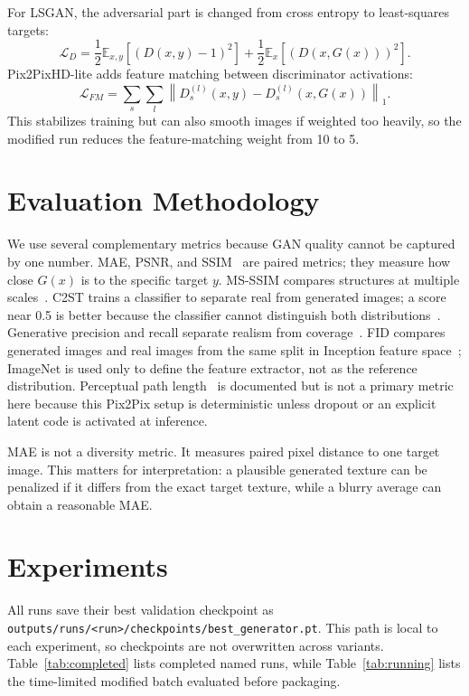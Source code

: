 \documentclass[conference]{IEEEtran}
\newcommand{\code}[1]{\texttt{#1}}
\begin{document}
For LSGAN, the adversarial part is changed from cross entropy to least-squares targets:
\begin{equation}
\mathcal{L}_{D}=\frac{1}{2}\mathbb{E}_{x,y}[(D(x,y)-1)^2]+\frac{1}{2}\mathbb{E}_{x}[(D(x,G(x)))^2].
\end{equation}
Pix2PixHD-lite adds feature matching between discriminator activations:
\begin{equation}
\mathcal{L}_{FM}=\sum_s\sum_l \left\|D_s^{(l)}(x,y)-D_s^{(l)}(x,G(x))\right\|_1.
\end{equation}
This stabilizes training but can also smooth images if weighted too heavily, so the modified run reduces the feature-matching weight from 10 to 5.

\section{Evaluation Methodology}
We use several complementary metrics because GAN quality cannot be captured by one number. MAE, PSNR, and SSIM~\cite{wang2004ssim} are paired metrics; they measure how close $G(x)$ is to the specific target $y$. MS-SSIM compares structures at multiple scales~\cite{wang2003msssim}. C2ST trains a classifier to separate real from generated images; a score near 0.5 is better because the classifier cannot distinguish both distributions~\cite{lopezpaz2017c2st}. Generative precision and recall separate realism from coverage~\cite{sajjadi2018precision,kynkaanniemi2019improved}. FID compares generated images and real images from the same split in Inception feature space~\cite{heusel2017fid}; ImageNet is used only to define the feature extractor, not as the reference distribution. Perceptual path length~\cite{karras2019stylegan} is documented but is not a primary metric here because this Pix2Pix setup is deterministic unless dropout or an explicit latent code is activated at inference.

MAE is not a diversity metric. It measures paired pixel distance to one target image. This matters for interpretation: a plausible generated texture can be penalized if it differs from the exact target texture, while a blurry average can obtain a reasonable MAE.

\section{Experiments}
All runs save their best validation checkpoint as \code{outputs/runs/<run>/checkpoints/best\_generator.pt}. This path is local to each experiment, so checkpoints are not overwritten across variants. Table~\ref{tab:completed} lists completed named runs, while Table~\ref{tab:running} lists the time-limited modified batch evaluated before packaging.
\end{document}
